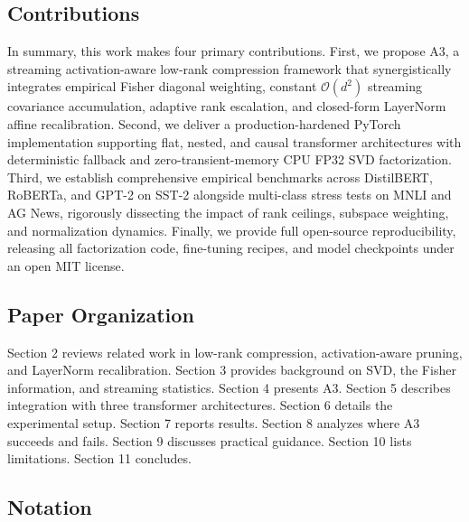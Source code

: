 \subsection{Contributions}

In summary, this work makes four primary contributions. First, we propose A3, a streaming activation-aware low-rank compression framework that synergistically integrates empirical Fisher diagonal weighting, constant $\mathcal{O}(d^2)$ streaming covariance accumulation, adaptive rank escalation, and closed-form LayerNorm affine recalibration. Second, we deliver a production-hardened PyTorch implementation supporting flat, nested, and causal transformer architectures with deterministic fallback and zero-transient-memory CPU FP32 SVD factorization. Third, we establish comprehensive empirical benchmarks across DistilBERT, RoBERTa, and GPT-2 on SST-2 alongside multi-class stress tests on MNLI and AG News, rigorously dissecting the impact of rank ceilings, subspace weighting, and normalization dynamics. Finally, we provide full open-source reproducibility, releasing all factorization code, fine-tuning recipes, and model checkpoints under an open MIT license.
\subsection{Paper Organization}

Section 2 reviews related work in low-rank compression, activation-aware 
pruning, and LayerNorm recalibration. Section 3 provides background on SVD, 
the Fisher information, and streaming statistics. Section 4 presents A3. 
Section 5 describes integration with three transformer architectures. Section 
6 details the experimental setup. Section 7 reports results. Section 8 
analyzes where A3 succeeds and fails. Section 9 discusses practical guidance. 
Section 10 lists limitations. Section 11 concludes.



\subsection{Notation}
